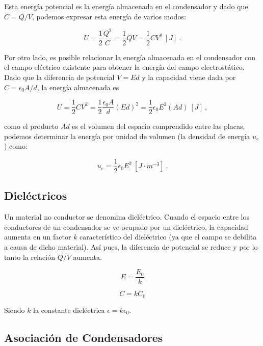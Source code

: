 \documentclass{tufte-handout}
\begin{document}
Esta energía potencial es la energía almacenada en el condensador y dado que $C = Q/V$, podemos expresar esta energía de varios modos:

\begin{equation}
U = \frac{1}{2}\frac{Q^2}{C} = \frac{1}{2}QV = \frac{1}{2}CV^2~[J]~.
\end{equation}

Por otro lado, es posible relacionar la energía almacenada en el condensador con el campo eléctrico existente para obtener la energía del campo electrostático. Dado que la diferencia de potencial $V = Ed$ y la capacidad viene dada por $C = \epsilon_0 A/d$, la energía almacenada es

\begin{equation}
U = \frac{1}{2}CV^2 = \frac{1}{2}\frac{\epsilon_0A}{d}(Ed)^2 = \frac{1}{2}\epsilon_0E^2(Ad)~[J]~,
\end{equation}

como el producto $Ad$ es el volumen del espacio comprendido entre las placas, podemos determinar la energía por unidad de volumen (la densidad de energía $u_e$) como:

\begin{equation}
u_e = \frac{1}{2}\epsilon_0E^2~[J\cdot m^{-3}]~.
\end{equation}

\subsection{Dieléctricos}

Un material no conductor se denomina dieléctrico. Cuando el espacio entre los conductores de un condensador se ve ocupado por un dieléctrico, la capacidad aumenta en un factor $k$ característico del dieléctrico (ya que el campo se debilita a causa de dicho material). Así pues, la diferencia de potencial se reduce y por lo tanto la relación $Q/V$ aumenta. 

\begin{equation}
E = \frac{E_0}{k}
\end{equation}

\begin{equation}
C = kC_0
\end{equation}

Siendo $k$ la constante dieléctrica $\epsilon = k\epsilon_0$.

\subsection{Asociación de Condensadores}
\end{document}
